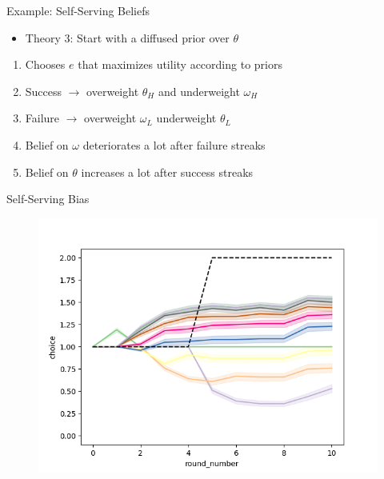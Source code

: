 \documentclass[aspectratio=169]{beamer}
\begin{document}
\begin{frame}{Example: Self-Serving Beliefs}
\begin{itemize}
    \item Theory 3: Start with a diffused prior over $\theta$
    \end{itemize}
    \bigskip
    \begin{enumerate}
        \item Chooses $e$ that maximizes utility according to priors
        \bigskip
        \item Success $\rightarrow$ overweight $\theta_H$ and underweight $\omega_H$\\
        \item Failure $\rightarrow$ overweight $\omega_L$ underweight $\theta_L$\\
        \bigskip
        \item Belief on $\omega$ deteriorates a lot after failure streaks
        \item Belief on $\theta$ increases a lot after success streaks\\
    \end{enumerate}
    
    
\end{frame}

\begin{frame}{Self-Serving Bias}
    \begin{figure}
        \centering
        \includegraphics[scale=.5]{figures2/self-serving_11.png}
    
    \end{figure}
\end{frame}
\end{document}
